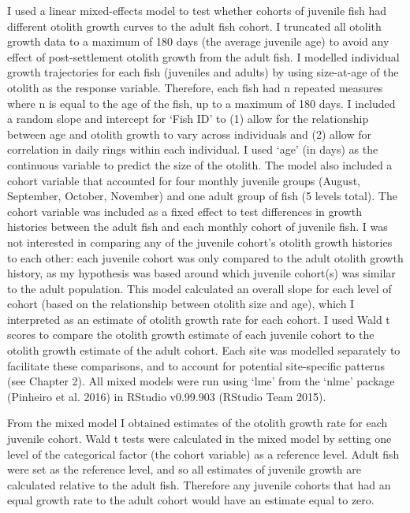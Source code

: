 \documentclass[]{book}
\begin{document}
I used a linear mixed-effects model to test whether cohorts of juvenile
fish had different otolith growth curves to the adult fish cohort. I
truncated all otolith growth data to a maximum of 180 days (the average
juvenile age) to avoid any effect of post-settlement otolith growth from
the adult fish. I modelled individual growth trajectories for each fish
(juveniles and adults) by using size-at-age of the otolith as the
response variable. Therefore, each fish had n repeated measures where n
is equal to the age of the fish, up to a maximum of 180 days. I included
a random slope and intercept for `Fish ID' to (1) allow for the
relationship between age and otolith growth to vary across individuals
and (2) allow for correlation in daily rings within each individual. I
used `age' (in days) as the continuous variable to predict the size of
the otolith. The model also included a cohort variable that accounted
for four monthly juvenile groups (August, September, October, November)
and one adult group of fish (5 levels total). The cohort variable was
included as a fixed effect to test differences in growth histories
between the adult fish and each monthly cohort of juvenile fish. I was
not interested in comparing any of the juvenile cohort's otolith growth
histories to each other: each juvenile cohort was only compared to the
adult otolith growth history, as my hypothesis was based around which
juvenile cohort(s) was similar to the adult population. This model
calculated an overall slope for each level of cohort (based on the
relationship between otolith size and age), which I interpreted as an
estimate of otolith growth rate for each cohort. I used Wald t scores to
compare the otolith growth estimate of each juvenile cohort to the
otolith growth estimate of the adult cohort. Each site was modelled
separately to facilitate these comparisons, and to account for potential
site-specific patterns (see Chapter 2). All mixed models were run using
`lme' from the `nlme' package (Pinheiro et al. 2016) in RStudio
v0.99.903 (RStudio Team 2015).

From the mixed model I obtained estimates of the otolith growth rate for
each juvenile cohort. Wald t tests were calculated in the mixed model by
setting one level of the categorical factor (the cohort variable) as a
reference level. Adult fish were set as the reference level, and so all
estimates of juvenile growth are calculated relative to the adult fish.
Therefore any juvenile cohorts that had an equal growth rate to the
adult cohort would have an estimate equal to zero.
\end{document}
